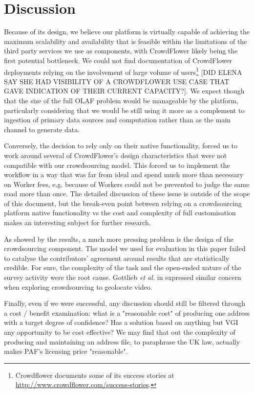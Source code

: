 \section{Discussion}

Because of its design, we believe our platform is virtually capable of achieving the maximum scalability and availability that is feasible within the limitations of the third party services we use as components, with CrowdFlower likely being the first potential bottleneck. We could not find documentation of CrowdFlower deployments relying on the involvement of large volume of users\footnote{Crowdflower documents some of its success stories at \url{http://www.crowdflower.com/success-stories}.} [DID ELENA SAY SHE HAD VISIBILITY OF A CROWDFLOWER USE CASE THAT GAVE INDICATION OF THEIR CURRENT CAPACITY?]. We expect though that the size of the full OLAF problem would be manageable by the platform, particularly considering that we would be still using it more as a complement to ingestion of primary data sources and computation rather than as the main channel to generate data.

Conversely, the decision to rely only on their native functionality, forced us to work around several of CrowdFlower's design characteristics that were not compatible with our crowdsourcing model. This forced us to implement the workflow in a way that was far from ideal and spend much more than necessary on Worker fees, e.g. because of Workers could not be prevented to judge the same road more than once. The detailed discussion of these issue is outside of the scope of this document, but the break-even point between relying on a crowdsourcing platform native functionality vs the cost and complexity of full customisation makes an interesting subject for further research.

As showed by the results, a much more pressing problem is the design of the crowdsourcing component. The model we used for evaluation in this paper failed to catalyse the contributors' agreement around results that are statistically credible. For sure, the complexity of the task and the open-ended nature of the survey activity were the root cause. Gottlieb {\it et al.} in \cite{Gottlieb:2012fh} expressed similar concern when exploring crowdsourcing to geolocate video.

Finally, even if we were successful, any discussion should still be filtered through a cost / benefit examination: what is a "reasonable cost" of producing one address with a target degree of confidence? Has a solution based on anything but VGI any opportunity to be cost effective? We may find that out the complexity of producing and maintaining an address file, to paraphrase the UK law, actually makes PAF's licensing price "reasonable".
